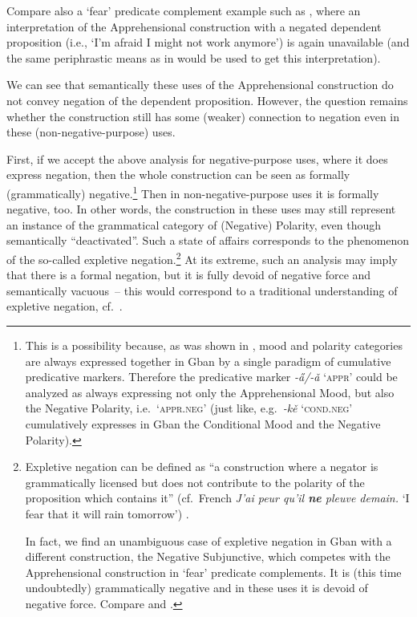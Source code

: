 \documentclass[output=paper,colorlinks,citecolor=brown
]{langscibook}
\begin{document}
 Compare also a `fear' predicate complement example such as , where an interpretation of the Apprehensional construction with a negated dependent proposition (i.e.,  `I'm afraid I might not work anymore') is again unavailable (and the same periphrastic means as in  would be used to get this interpretation).


\z

 We can see that semantically these uses of the Apprehensional construction do not convey negation of the dependent proposition. However, the question remains whether the construction still has some (weaker) connection to negation even in these (non-negative-purpose) uses.

First, if we accept the above analysis for negative-purpose uses, where it does express negation, then the whole construction can be seen as formally (grammatically) negative.\footnote{This is a possibility because, as was shown in , mood and polarity categories are always expressed together in Gban by a single paradigm of cumulative predicative markers. Therefore the predicative marker \textit{-a̋/-ǎ} `\textsc{appr}' could be analyzed as always expressing not only the Apprehensional Mood, but also the Negative Polarity, i.e.\ `\textsc{appr.neg}' (just like, e.g.\ \textit{-kě} `\textsc{cond.neg}' cumulatively expresses in Gban the Conditional Mood and the Negative Polarity).} Then in non-negative-purpose uses it is formally negative, too. In other words, the construction in these uses may still represent an instance of the grammatical category of (Negative) Polarity, even though semantically ``deactivated''. Such a state of affairs corresponds to the phenomenon of the so-called expletive negation.\footnote{Expletive negation can be defined as ``a construction where a negator is grammatically licensed but does not contribute to the polarity of the proposition which contains it'' (cf.\ French \textit{J'ai peur qu'il \textbf{ne} pleuve demain.} `I fear that it will rain tomorrow') \citep[1]{jinkoenig2020}.

In fact, we find an unambiguous case of expletive negation in Gban with a different construction, the Negative Subjunctive, which competes with the Apprehensional construction in `fear' predicate complements. It is (this time undoubtedly) grammatically negative and in these uses it is devoid of negative force. Compare  and .} At its extreme, such an analysis may imply that there is a formal negation, but it is fully devoid of negative force and semantically vacuous~-- this would correspond to a traditional understanding of expletive negation, cf.\ \citet{espinal1992}.
\end{document}
